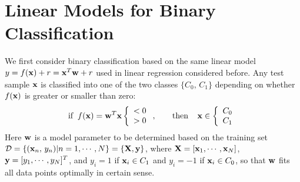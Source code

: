 \documentclass{article}
\begin{document}
\begin{comment}
\htmladdimg{../figures/TSM2a.png}

The first 16 iterations

\htmladdimg{../figures/TSM2b.png}

The last 16 iterations

{\bf Example 2:} Traveling salesman problem, 1-D SOM trained by a set of random dots:

\htmladdimg{../figures/TSM1c.png}

The first 16 iterations

\htmladdimg{../figures/TSM1d.png}

The last 16 iterations
\end{comment}




\section{Linear Models for Binary Classification}

We first consider binary classification based on the same
linear model $y=f({\bf x})+r={\bf x}^T{\bf w}+r$ used in 
linear regression considered before. Any test sample ${\bf x}$
is classified into one of the two classes $\{C_0,\,C_1\}$ 
depending on whether $f({\bf x})$ is greater or smaller than 
zero:
\begin{equation}
  \mbox{if}\;\;f({\bf x})={\bf w}^T{\bf x}\left\{\begin{array}{l}<0\\>0
  \end{array}\right.,\;\;\;\;\;\;\;\mbox{then}\;\;\;\;
       {\bf x}\in \left\{\begin{array}{c}  C_0 \\ C_1\end{array}\right.
\end{equation}
Here ${\bf w}$ is a model parameter to be determined based on
the training set 
${\cal D}=\{({\bf x}_n,\,y_n)|n=1,\cdots,N\}=\{{\bf X},{\bf y}\}$,
where ${\bf X}=[{\bf x}_1,\cdots,{\bf x}_N]$, ${\bf y}=[y_1,\cdots,y_N]^T$,
and $y_i=1$ if ${\bf x}_i\in C_1$ and $y_i=-1$ if ${\bf x}_i\in C_0$,
so that ${\bf w}$ fits all data points optimally in certain sense.
\end{document}
